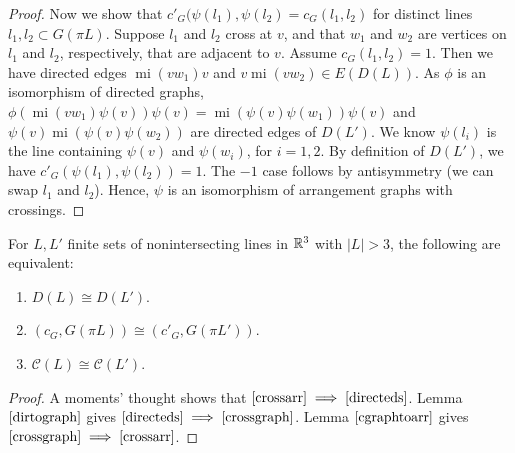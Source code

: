 \documentclass[11pt, oneside]{article}
\newcommand{\mi}{\operatorname{mi}}
\begin{document}
\begin{proof}
Now we show that $c'_G(\psi(l_1), \psi(l_2) = c_G(l_1, l_2)$ for distinct lines $l_1, l_2 \subset G(\pi L)$. Suppose $l_1$ and $l_2$ cross at $v$, and that $w_1$ and $w_2$ are vertices on $l_1$ and $l_2$, respectively, that are adjacent to $v$. Assume $c_G(l_1, l_2) =1$. 
Then we have directed edges $\mi(vw_1)v$ and $ v \mi(vw_2) \in E(D(L))$. As $\phi$ is an isomorphism of directed graphs, $\phi(\mi(vw_1)\psi(v))\psi(v) = \mi (\psi(v)\psi(w_1))\psi(v)$ and $\psi(v)\mi (\psi(v)\psi(w_2))$ are directed edges of $D(L')$. 
We know $\psi(l_i)$ is the line containing $\psi(v)$ and $\psi(w_i)$, for $i=1,2$. By definition of $D(L')$, we have $c'_G(\psi(l_1), \psi(l_2)) = 1$. The $-1$ case follows by antisymmetry (we can swap $l_1$ and $l_2$). Hence, $\psi$ is an isomorphism of arrangement graphs with crossings. 
\end{proof}

\begin{thm} For $L, L'$ finite sets of nonintersecting lines in $\mathbb{R}^3$ with $|L| > 3$, the following are equivalent:
\begin{enumerate}
\item $D(L) \cong D(L')$. \label{directeds}
\item $(c_G, G(\pi L))\cong (c'_G, G(\pi L'))$. \label{crossgraph}
\item $\mathcal{C}(L) \cong \mathcal{C}(L')$. \label{crossarr}
\end{enumerate}
\end{thm}

\begin{proof}
A moments' thought shows that $\ref{crossarr} \implies \ref{directeds}$.  Lemma $\ref{dirtograph}$ gives $\ref{directeds} \implies \ref{crossgraph}$. Lemma $\ref{cgraphtoarr}$ gives $\ref{crossgraph} \implies \ref{crossarr}$. \end{proof}
 
 







 
\end{document}
